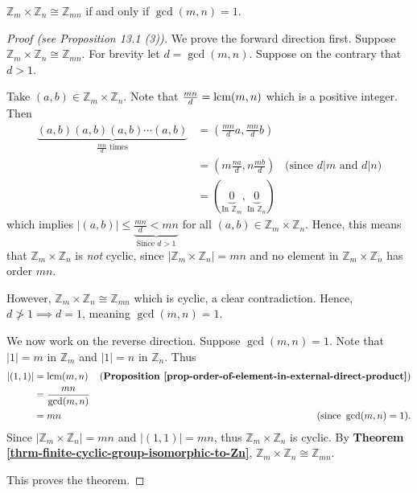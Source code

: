 \begin{theorem}\label{thrm-Zm-cross-Zn-isomorphic-to-Zmn-condition}
    $\mathbb{Z}_m \times \mathbb{Z}_n \cong \mathbb{Z}_{mn}$ if and only if $\gcd(m,n) = 1$.
\end{theorem}
\begin{proof}[Proof (see \cite{humphreys_1996} Proposition 13.1 (3))]
    We prove the forward direction first. Suppose $\mathbb{Z}_m \times \mathbb{Z}_n \cong \mathbb{Z}_{mn}$. For brevity let $d = \gcd(m,n)$. Suppose on the contrary that $d > 1$.

    Take $(a, b) \in \mathbb{Z}_m \times \mathbb{Z}_n$. Note that $\frac{mn}{d} = \mathrm{lcm}(m,n)$ which is a positive integer. Then
    \begin{align*}
        \underbrace{(a,b)(a,b)(a,b)\cdots(a,b)}_{\frac{mn}{d}\text{ times}}    &= \left(\frac{mn}{d}a, \frac{mn}{d}b\right)\\
        &= \left(m\frac{na}{d}, n\frac{mb}{d}\right) & \text{(since } d | m \text{ and } d | n)\\
        &= (\underbrace{0}_{\text{In } \mathbb{Z}_m}, \underbrace{0}_{\text{In } \mathbb{Z}_n})
    \end{align*}
    which implies $|(a, b)| \leq \underbrace{\frac{mn}{d} < mn}_{\text{Since } d > 1}$ for all $(a, b) \in \mathbb{Z}_m \times \mathbb{Z}_n$. Hence, this means that $\mathbb{Z}_m \times \mathbb{Z}_n$ is \textit{not} cyclic, since $|\mathbb{Z}_m \times \mathbb{Z}_n| = mn$ and no element in $\mathbb{Z}_m \times \mathbb{Z}_n$ has order $mn$.

    However, $\mathbb{Z}_m \times \mathbb{Z}_n \cong \mathbb{Z}_{mn}$ which is cyclic, a clear contradiction. Hence, $d \not>1 \implies d = 1$, meaning $\gcd(m,n) = 1$.

    We now work on the reverse direction. Suppose $\gcd(m,n) = 1$. Note that $|1| = m$ in $\mathbb{Z}_m$ and $|1| = n$ in $\mathbb{Z}_n$. Thus
    \begin{align*}
        |(1, 1)| &= \mathrm{lcm}(m, n) & \text{(\textbf{Proposition \ref{prop-order-of-element-in-external-direct-product}})}\\
        &= \frac{mn}{\gcd(m,n)}\\
        &= mn & \text{(since }\gcd(m,n) = 1).
    \end{align*}
    Since $|\mathbb{Z}_m \times \mathbb{Z}_n| = mn$ and $|(1,1)| = mn$, thus $\mathbb{Z}_m \times \mathbb{Z}_n$ is cyclic. By \textbf{Theorem \ref{thrm-finite-cyclic-group-isomorphic-to-Zn}}, $\mathbb{Z}_m \times \mathbb{Z}_n \cong \mathbb{Z}_{mn}$.

    This proves the theorem.
\end{proof}

